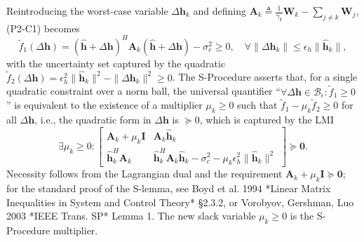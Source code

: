 \documentclass[12pt,a4paper]{article}
\newcommand{\vect}[1]{\mathbf{#1}}
\newcommand{\mat}[1]{\mathbf{#1}}
\begin{document}
Reintroducing the worst-case variable $\Delta\vect{h}_k$ and defining $\mat{A}_k \triangleq \frac{1}{\gamma_k} \mat{W}_k - \sum_{j\neq k} \mat{W}_j$, (P2-C1) becomes
$$
\tilde{f}_1(\Delta\vect{h}) = (\hat{\vect{h}} + \Delta\vect{h})^H \mat{A}_k (\hat{\vect{h}} + \Delta\vect{h}) - \sigma_c^2 \geq 0, \quad \forall \|\Delta\vect{h}_k\| \leq \epsilon_h \|\hat{\vect{h}}_k\|,
$$
with the uncertainty set captured by the quadratic $\tilde{f}_2(\Delta\vect{h}) = \epsilon_h^2 \|\hat{\vect{h}}_k\|^2 - \|\Delta\vect{h}_k\|^2 \geq 0$. The S-Procedure asserts that, for a single quadratic constraint over a norm ball, the universal quantifier ``$\forall \Delta\vect{h} \in \mathcal{B}_\epsilon: \tilde{f}_1 \geq 0$'' is equivalent to the existence of a multiplier $\mu_k \geq 0$ such that $\tilde{f}_1 - \mu_k \tilde{f}_2 \geq 0$ for all $\Delta\vect{h}$, i.e., the quadratic form in $\Delta\vect{h}$ is $\succeq 0$, which is captured by the LMI
\begin{equation}
\exists \mu_k \geq 0: \begin{bmatrix} \mat{A}_k + \mu_k \mat{I} & \mat{A}_k \hat{\vect{h}}_k \\[1.2ex] \hat{\vect{h}}_k^H \mat{A}_k & \hat{\vect{h}}_k^H \mat{A}_k \hat{\vect{h}}_k - \sigma_c^2 - \mu_k \epsilon_h^2 \|\hat{\vect{h}}_k\|^2 \end{bmatrix} \succeq \mat{0}. \tag{S3.1}
\end{equation}
Necessity follows from the Lagrangian dual and the requirement $\mat{A}_k + \mu_k \mat{I} \succeq \mat{0}$; for the standard proof of the S-lemma, see Boyd et al. 1994 *Linear Matrix Inequalities in System and Control Theory* §2.3.2, or Vorobyov, Gershman, Luo 2003 *IEEE Trans. SP* Lemma 1. The new slack variable $\mu_k \geq 0$ is the S-Procedure multiplier.
\end{document}
